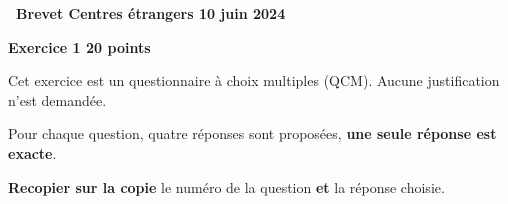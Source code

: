 \documentclass[11pt]{article}
\begin{document}
\hypertarget{Etranger}{}
\label{Etranger}

\pagestyle{fancy}
\thispagestyle{empty}
\begin{center} {\huge \textbf{\decofourleft~Brevet Centres étrangers 10 juin 2024 \decofourright}}
\end{center}

\bigskip

\textbf{Exercice 1 \hfill 20 points}

\medskip

Cet exercice est un questionnaire à choix multiples (QCM). Aucune justification n'est demandée.

Pour chaque question, quatre réponses sont proposées, \textbf{une seule réponse est exacte}.

\textbf{Recopier sur la copie} le numéro de la question \textbf{et} la réponse choisie.
\end{document}

